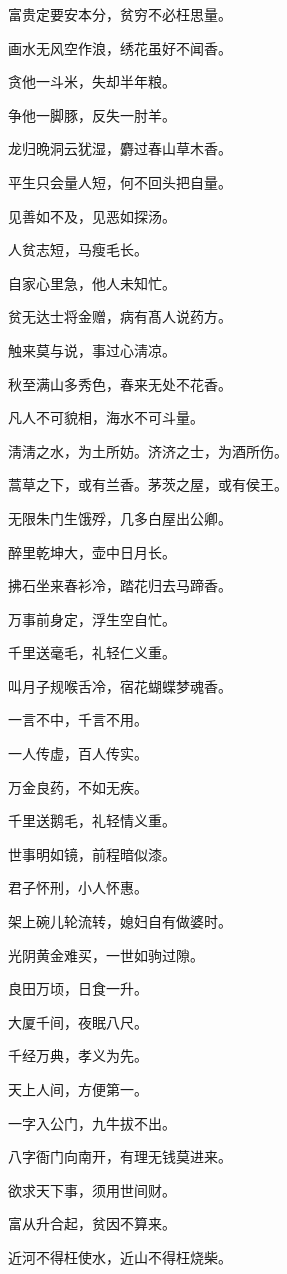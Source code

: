 \documentclass[12pt,oneside]{book}
\begin{document}
富贵定要安本分，贫穷不必枉思量。

画水无风空作浪，绣花虽好不闻香。

贪他一斗米，失却半年粮。

争他一脚豚，反失一肘羊。

龙归晩洞云犹湿，麝过春山草木香。

平生只会量人短，何不回头把自量。

见善如不及，见恶如探汤。

人贫志短，马瘦毛长。

自家心里急，他人未知忙。

贫无达士将金赠，病有髙人说药方。

触来莫与说，事过心淸凉。

秋至满山多秀色，春来无处不花香。

凡人不可貌相，海水不可斗量。

淸淸之水，为土所妨。济济之士，为酒所伤。

蒿草之下，或有兰香。茅茨之屋，或有侯王。

无限朱门生饿殍，几多白屋出公卿。

醉里乾坤大，壶中日月长。

拂石坐来春衫冷，踏花归去马蹄香。

万事前身定，浮生空自忙。

千里送毫毛，礼轻仁义重。

叫月子规喉舌冷，宿花蝴蝶梦魂香。

一言不中，千言不用。

一人传虚，百人传实。

万金良药，不如无疾。

千里送鹅毛，礼轻情义重。

世事明如镜，前程暗似漆。

君子怀刑，小人怀惠。

架上碗儿轮流转，媳妇自有做婆时。

光阴黄金难买，一世如驹过隙。

良田万顷，日食一升。

大厦千间，夜眠八尺。

千经万典，孝义为先。

天上人间，方便第一。

一字入公门，九牛拔不出。

八字衙门向南开，有理无钱莫进来。

欲求天下事，须用世间财。

富从升合起，贫因不算来。

近河不得枉使水，近山不得枉烧柴。
\end{document}
